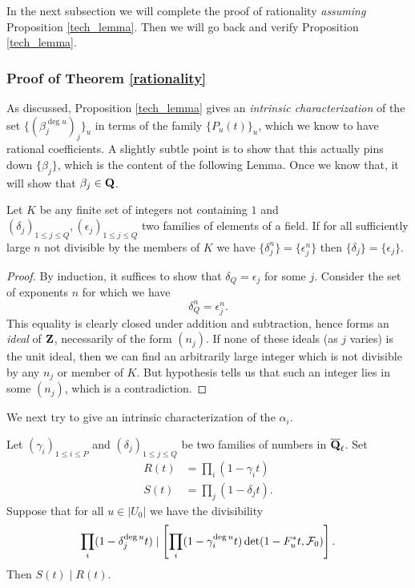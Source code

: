 In the next subsection we will complete the proof of rationality \emph{assuming} Proposition \ref{tech_lemma}. Then we will go back and verify Proposition \ref{tech_lemma}.

\subsubsection{Proof of Theorem \ref{rationality}}

As discussed, Proposition \ref{tech_lemma} gives an \emph{intrinsic characterization} of the set $\{(\beta_j^{\deg u})_j\}_u$ in terms of the family $\{P_u(t)\}_u$, which we know to have rational coefficients. A slightly subtle point is to show that this actually pins down $\{\beta_j\}$, which is the content of the following Lemma. Once we know that, it will show that $\beta_j \in \mathbf{Q}$. 


\begin{lem}
Let $K$ be any finite set of integers not containing $1$ and $(\delta_j)_{1 \leq j \leq Q}, (\epsilon_j)_{1 \leq j \leq Q}$ two families of elements of a field. If for all sufficiently large $n$ not divisible by the members of $K$ we have $\{\delta_j^n\} = \{\epsilon_j^n\}$ then $\{\delta_j \} = \{\epsilon_j\}$. 
\end{lem}


\begin{proof}
By induction, it suffices to show that $\delta_Q = \epsilon_j$ for some $j$. Consider the set of exponents $n$ for which we have 
\[
\delta_Q^n = \epsilon_j^n.
\]
This equality is clearly closed under addition and subtraction, hence forms an \emph{ideal} of $\mathbf{Z}$, necessarily of the form $(n_j)$. If none of these ideals (as $j$ varies) is the unit ideal, then we can find an arbitrarily large integer which is not divisible by any $n_j$ or member of $K$. But hypothesis tells us that such an integer lies in some $(n_j)$, which is a contradiction. 
\end{proof}


We next try to give an intrinsic characterization of the $\alpha_i$. 


\begin{prop}\label{num_recognition}
Let $(\gamma_i)_{1 \leq i \leq P}$ and $(\delta_j)_{1 \leq j \leq Q}$ be two families of numbers in $\overline{\mathbf{Q}}_{\ell}$. Set 
\begin{align*}
R(t) & = \prod_i (1-\gamma_i t)\\
S(t) & = \prod_j (1-\delta_j t).
\end{align*}
Suppose that for all $u \in |U_0|$ we have the divisibility 
\[
\prod_i (1-\delta_j^{\deg u} t)  \mid \left[ \prod_i (1-\gamma_i^{\deg u} t) \det (1-F_u^* t, \mathcal{F}_0) \right].
\]
Then $S(t) \mid R(t)$. 
\end{prop}

